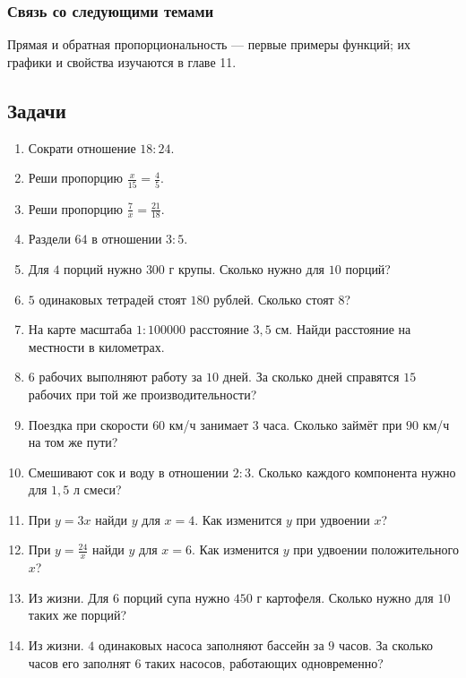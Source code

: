 \documentclass[12pt,a4paper]{article}
\theoremstyle{definition}
\theoremstyle{plain}
\theoremstyle{remark}
\begin{document}
\subsubsection*{Связь со следующими темами}
Прямая и обратная пропорциональность — первые примеры функций; их графики и свойства изучаются в главе 11.
\subsection*{Задачи}
\begin{enumerate}[label=\thesection.\arabic*.,leftmargin=2.8em,itemsep=12pt]
\item Сократи отношение \(18 : 24\).
\item Реши пропорцию \(\frac{x}{15} = \frac{4}{5}\).
\item Реши пропорцию \(\frac{7}{x} = \frac{21}{18}\).
\item Раздели \(64\) в отношении \(3 : 5\).
\item Для \(4\) порций нужно \(300\) г крупы. Сколько нужно для \(10\) порций?
\item \(5\) одинаковых тетрадей стоят \(180\) рублей. Сколько стоят \(8\)?
\item На карте масштаба \(1 : 100 000\) расстояние \(3,5\) см. Найди расстояние на местности в километрах.
\item \(6\) рабочих выполняют работу за \(10\) дней. За сколько дней справятся \(15\) рабочих при той же производительности?
\item Поездка при скорости \(60\) км/ч занимает \(3\) часа. Сколько займёт при \(90\) км/ч на том же пути?
\item Смешивают сок и воду в отношении \(2 : 3\). Сколько каждого компонента нужно для \(1{,}5\) л смеси?
\item При \(y = 3 x\) найди \(y\) для \(x = 4\). Как изменится \(y\) при удвоении \(x\)?
\item При \(y = \frac{24}{x}\) найди \(y\) для \(x = 6\). Как изменится \(y\) при удвоении положительного \(x\)?
\item Из жизни. Для \(6\) порций супа нужно \(450\) г картофеля. Сколько нужно для \(10\) таких же порций?
\item Из жизни. \(4\) одинаковых насоса заполняют бассейн за \(9\) часов. За сколько часов его заполнят \(6\) таких насосов, работающих одновременно?

\end{enumerate}
\end{document}
